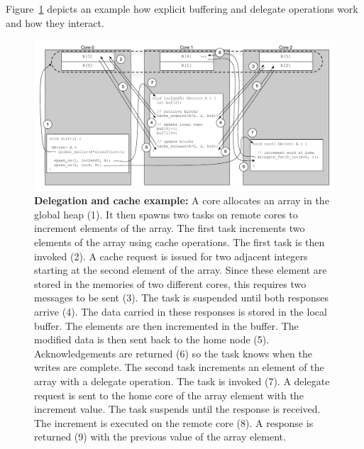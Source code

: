 Figure~\ref{fig:delegate-cache} depicts an example how explicit
buffering and
delegate operations work and how they interact.

\begin{figure}[htb] \begin{center}
\includegraphics[width=1.5\columnwidth]{figs/delegate-cache}
\begin{minipage}{1.9\columnwidth} \caption{\label{fig:delegate-cache}
\textbf{Delegation and cache example:} A core allocates an array in the global
heap (1). It then spawns two tasks on remote cores to increment elements of
the array. The first task increments two elements of the array using cache
operations. The first task is then invoked (2). A cache request is issued for two
adjacent integers starting at the second element of the array. Since these
element are stored in the memories of two different cores, this requires two messages to be sent (3). The task is suspended until both responses arrive
(4). The data carried in these responses is stored in the local buffer. The
elements are then incremented in the buffer. The modified data is then sent back
to the home node (5). Acknowledgements are returned (6) so the task
knows when the writes are complete. The second task increments an element of
the array with a delegate operation. The task is invoked (7). A delegate
request is sent to the home core of the array element with the increment
value. The task suspends until the response is received. The increment
is executed on the remote core (8). A response is returned (9) with the
previous value of the array element. } \end{minipage} \vspace{-3ex}
\end{center} \end{figure}


